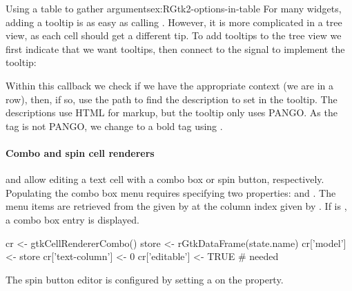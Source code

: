 \begin{example}{Using a table to gather arguments}{ex:RGtk2-options-in-table}
For many widgets, adding a
tooltip is as easy as calling
. However, it is more complicated in
a tree view, as each cell should get a different tip.  To add tooltips
to the tree view we first indicate that we want tooltips, then connect
to the  signal to implement the tooltip:
\begin{Schunk}
\end{Schunk}
%
Within this callback we check if we have the appropriate context (we
are in a row), then, if so, use the path to find the description to
set in the tooltip. The descriptions use HTML for markup, but the
tooltip only uses PANGO. As the  tag is not PANGO, we
change to a bold tag using .
\end{example}



\paragraph{Combo and spin cell renderers}

 and  allow
editing a text cell with a combo box or spin button,
respectively. Populating the combo box menu requires specifying two
properties:  and . The menu items are
retrieved from the  given by  at the
column index given by .  If  is
, a combo box entry is displayed.
\begin{Schunk}
\begin{Sinput}
 cr <- gtkCellRendererCombo()
 store <- rGtkDataFrame(state.name)
 cr['model'] <- store
 cr['text-column'] <- 0
 cr['editable'] <- TRUE                  # needed
\end{Sinput}
\end{Schunk}
%
The spin button editor is configured by setting a
 on the  property.


